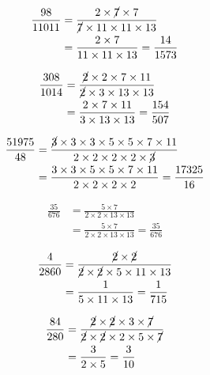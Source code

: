{{\item\begin{align*}
    \frac{98}{11011} &=
    \frac{2 \times \cancel{7} \times 7}
    {\cancel{7} \times 11 \times 11 \times 13}\\ &=
    \frac{2 \times 7}
    {11 \times 11 \times 13} =
    \frac{14}{1573}
    \end{align*}

\item\begin{align*}
    \frac{308}{1014} &=
    \frac{\cancel{2} \times 2 \times 7 \times 11}
    {\cancel{2} \times 3 \times 13 \times 13}\\ &=
    \frac{2 \times 7 \times 11}
    {3 \times 13 \times 13} =
    \frac{154}{507}
    \end{align*}

\item\begin{align*}
    \frac{51975}{48} &=
    \frac{\cancel{3} \times 3 \times 3 \times 5 \times 5 \times 7 \times 11}
    {2 \times 2 \times 2 \times 2 \times \cancel{3}}\\ &=
    \frac{3 \times 3 \times 5 \times 5 \times 7 \times 11}
    {2 \times 2 \times 2 \times 2} =
    \frac{17325}{16}
    \end{align*}

\item\begin{align*}
    \frac{35}{676} &=
    \frac{5 \times 7}
    {2 \times 2 \times 13 \times 13}\\ &=
    \frac{5 \times 7}
    {2 \times 2 \times 13 \times 13} =
    \frac{35}{676}
    \end{align*}

\item\begin{align*}
    \frac{4}{2860} &=
    \frac{\cancel{2} \times \cancel{2}}
    {\cancel{2} \times \cancel{2} \times 5 \times 11 \times 13}\\ &=
    \frac{1}
    {5 \times 11 \times 13} =
    \frac{1}{715}
    \end{align*}

\item\begin{align*}
    \frac{84}{280} &=
    \frac{\cancel{2} \times \cancel{2} \times 3 \times \cancel{7}}
    {\cancel{2} \times \cancel{2} \times 2 \times 5 \times \cancel{7}}\\ &=
    \frac{3}
    {2 \times 5} =
    \frac{3}{10}
    \end{align*}

}}
